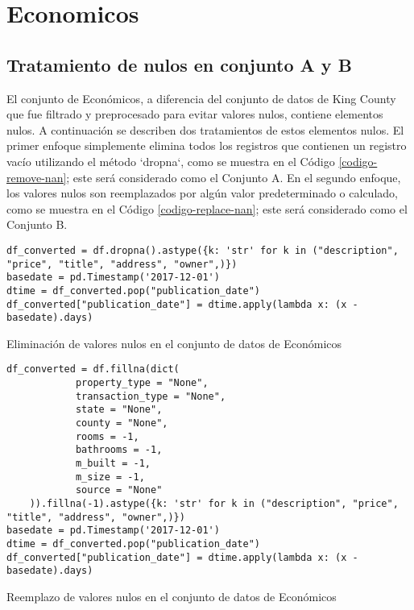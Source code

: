 \section{Economicos}
\subsection{Tratamiento de nulos en conjunto A y B}
El conjunto de Económicos, a diferencia del conjunto de datos de King County que fue filtrado y preprocesado para evitar valores nulos, contiene elementos nulos. A continuación se describen dos tratamientos de estos elementos nulos. El primer enfoque simplemente elimina todos los registros que contienen un registro vacío utilizando el método `dropna`, como se muestra en el Código \ref{codigo-remove-nan}; este será considerado como el Conjunto A. En el segundo enfoque, los valores nulos son reemplazados por algún valor predeterminado o calculado, como se muestra en el Código \ref{codigo-replace-nan}; este será considerado como el Conjunto B.

\begin{listing}[H]
    \begin{verbatim}
df_converted = df.dropna().astype({k: 'str' for k in ("description", "price", "title", "address", "owner",)})
basedate = pd.Timestamp('2017-12-01')
dtime = df_converted.pop("publication_date")
df_converted["publication_date"] = dtime.apply(lambda x: (x - basedate).days)
    \end{verbatim}
\caption{Eliminación de valores nulos en el conjunto de datos de Económicos}
\label{codigo-remove-nan}
\end{listing}

\begin{listing}[H]
    \begin{verbatim}
df_converted = df.fillna(dict(
            property_type = "None",
            transaction_type = "None",
            state = "None",
            county = "None",
            rooms = -1,
            bathrooms = -1,
            m_built = -1,
            m_size = -1,
            source = "None"
    )).fillna(-1).astype({k: 'str' for k in ("description", "price", "title", "address", "owner",)})
basedate = pd.Timestamp('2017-12-01')
dtime = df_converted.pop("publication_date")
df_converted["publication_date"] = dtime.apply(lambda x: (x - basedate).days)
    \end{verbatim}
\caption{Reemplazo de valores nulos en el conjunto de datos de Económicos}
\label{codigo-replace-nan}
\end{listing}

